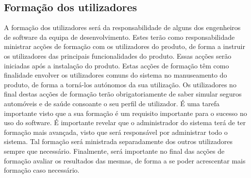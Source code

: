 \subsection{Formação dos utilizadores}
A formação dos utilizadores será da responsabilidade de alguns dos engenheiros de software da equipa de desenvolvimento. Estes terão como responsabilidade ministrar acções de formação com os utilizadores do produto, de forma a instruir os utilizadores das principais funcionalidades do produto. Essas acções serão iniciadas após a instalação do produto. 
Estas acções de formação têm como finalidade envolver os utilizadores comuns do sistema no manuseamento do produto, de forma a torná-los autónomos da sua utilização. Os utilizadores no final destas acções de formação terão obrigatoriamente de saber simular seguros automóveis e de saúde consoante o seu perfil de utilizador. É uma tarefa importante visto que a sua formação é um requisito importante para o sucesso no uso do software.
É importante revelar que o administrador do sistema terá de ter formação mais avançada, visto que será responsável por administrar todo o sistema. Tal formação será ministrada separadamente dos outros utilizadores sempre que necessário.
Finalmente, será importante no final das acções de formação avaliar os resultados das mesmas, de forma a se poder acrescentar mais formação caso necessário.

